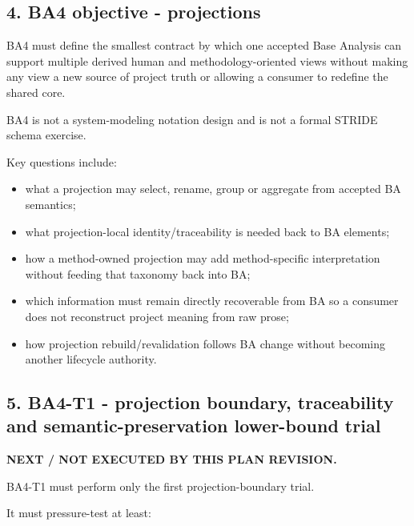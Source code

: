\documentclass[11pt,a4paper]{article}
\providecommand{\tightlist}{\setlength{\itemsep}{0pt}\setlength{\parskip}{0pt}}
\begin{document}
\subsection{4. BA4 objective - projections}\label{ba4-objective---projections}

BA4 must define the smallest contract by which one accepted Base Analysis can support multiple derived human and methodology-oriented views without making any view a new source of project truth or allowing a consumer to redefine the shared core.

BA4 is not a system-modeling notation design and is not a formal STRIDE schema exercise.

Key questions include:

\begin{itemize}
\tightlist
\item
  what a projection may select, rename, group or aggregate from accepted BA semantics;
\item
  what projection-local identity/traceability is needed back to BA elements;
\item
  how a method-owned projection may add method-specific interpretation without feeding that taxonomy back into BA;
\item
  which information must remain directly recoverable from BA so a consumer does not reconstruct project meaning from raw prose;
\item
  how projection rebuild/revalidation follows BA change without becoming another lifecycle authority.
\end{itemize}

\subsection{5. BA4-T1 - projection boundary, traceability and semantic-preservation lower-bound trial}\label{ba4-t1---projection-boundary-traceability-and-semantic-preservation-lower-bound-trial}

\textbf{NEXT / NOT EXECUTED BY THIS PLAN REVISION.}

BA4-T1 must perform only the first projection-boundary trial.

It must pressure-test at least:
\end{document}
